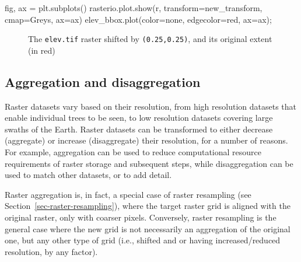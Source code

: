 \documentclass[
  letterpaper,
]{krantz}
\newenvironment{Shaded}{\begin{snugshade}}{\end{snugshade}}
\newcommand{\NormalTok}[1]{\textcolor[rgb]{0.00,0.23,0.31}{#1}}
\newcommand{\OperatorTok}[1]{\textcolor[rgb]{0.37,0.37,0.37}{#1}}
\newcommand{\StringTok}[1]{\textcolor[rgb]{0.13,0.47,0.30}{#1}}
\begin{document}
\begin{Shaded}
\begin{Highlighting}[]
\NormalTok{fig, ax }\OperatorTok{=}\NormalTok{ plt.subplots()}
\NormalTok{rasterio.plot.show(r, transform}\OperatorTok{=}\NormalTok{new\_transform, cmap}\OperatorTok{=}\StringTok{\textquotesingle{}Greys\textquotesingle{}}\NormalTok{, ax}\OperatorTok{=}\NormalTok{ax)}
\NormalTok{elev\_bbox.plot(color}\OperatorTok{=}\StringTok{\textquotesingle{}none\textquotesingle{}}\NormalTok{, edgecolor}\OperatorTok{=}\StringTok{\textquotesingle{}red\textquotesingle{}}\NormalTok{, ax}\OperatorTok{=}\NormalTok{ax)}\OperatorTok{;}
\end{Highlighting}
\end{Shaded}

\begin{figure}[H]


\caption{\label{fig-raster-shift-origin2}The \texttt{elev.tif} raster
shifted by \texttt{(0.25,0.25)}, and its original extent (in red)}

\end{figure}%

\subsection{Aggregation and disaggregation}\label{sec-raster-agg-disagg}

Raster datasets vary based on their resolution, from high resolution
datasets that enable individual trees to be seen, to low resolution
datasets covering large swaths of the Earth. Raster datasets can be
transformed to either decrease (aggregate) or increase (disaggregate)
their resolution, for a number of reasons. For example, aggregation can
be used to reduce computational resource requirements of raster storage
and subsequent steps, while disaggregation can be used to match other
datasets, or to add detail.

\begin{tcolorbox}[enhanced jigsaw, title=\textcolor{quarto-callout-note-color}{\faInfo}\hspace{0.5em}{Note}, coltitle=black, colbacktitle=quarto-callout-note-color!10!white, breakable, titlerule=0mm, colframe=quarto-callout-note-color-frame, opacitybacktitle=0.6, colback=white, bottomrule=.15mm, left=2mm, leftrule=.75mm, toprule=.15mm, toptitle=1mm, bottomtitle=1mm, arc=.35mm, opacityback=0, rightrule=.15mm]

Raster aggregation is, in fact, a special case of raster resampling (see
Section~\ref{sec-raster-resampling}), where the target raster grid is
aligned with the original raster, only with coarser pixels. Conversely,
raster resampling is the general case where the new grid is not
necessarily an aggregation of the original one, but any other type of
grid (i.e., shifted and or having increased/reduced resolution, by any
factor).

\end{tcolorbox}
\end{document}
